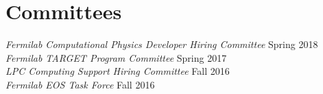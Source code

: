 \section{Committees}
{\sl Fermilab Computational Physics Developer Hiring Committee} \hfill Spring 2018\\
{\sl Fermilab TARGET Program Committee} \hfill Spring 2017\\
{\sl LPC Computing Support Hiring Committee} \hfill Fall 2016\\
{\sl Fermilab EOS Task Force} \hfill Fall 2016%

